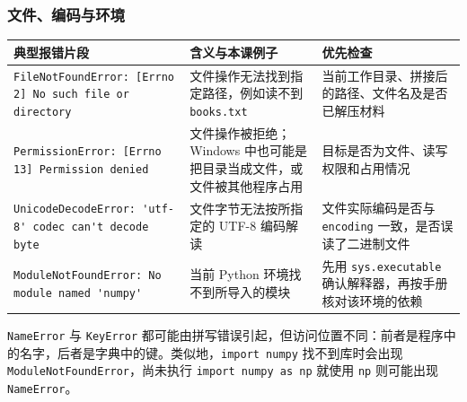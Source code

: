 \documentclass[UTF8,a4paper,11pt,fontset=fandol]{ctexart}
\providecommand{\passthrough}[1]{#1}
\begin{document}
\clearpage

\subsubsection{文件、编码与环境}\label{ux6587ux4ef6ux7f16ux7801ux4e0eux73afux5883}

\begin{longtable}[]{@{}
  >{\raggedright\arraybackslash}p{}
  >{\raggedright\arraybackslash}p{}
  >{\raggedright\arraybackslash}p{}@{}}
\toprule\noalign{}
\begin{minipage}[b]{\linewidth}\raggedright
典型报错片段
\end{minipage} & \begin{minipage}[b]{\linewidth}\raggedright
含义与本课例子
\end{minipage} & \begin{minipage}[b]{\linewidth}\raggedright
优先检查
\end{minipage} \\
\midrule\noalign{}
\endhead
\bottomrule\noalign{}
\endlastfoot
\passthrough{\lstinline!FileNotFoundError: [Errno 2] No such file or directory!} & 文件操作无法找到指定路径，例如读不到 \passthrough{\lstinline!books.txt!} & 当前工作目录、拼接后的路径、文件名及是否已解压材料 \\
\passthrough{\lstinline!PermissionError: [Errno 13] Permission denied!} & 文件操作被拒绝；Windows 中也可能是把目录当成文件，或文件被其他程序占用 & 目标是否为文件、读写权限和占用情况 \\
\passthrough{\lstinline!UnicodeDecodeError: 'utf-8' codec can't decode byte!} & 文件字节无法按所指定的 UTF-8 编码解读 & 文件实际编码是否与 \passthrough{\lstinline!encoding!} 一致，是否误读了二进制文件 \\
\passthrough{\lstinline!ModuleNotFoundError: No module named 'numpy'!} & 当前 Python 环境找不到所导入的模块 & 先用 \passthrough{\lstinline!sys.executable!} 确认解释器，再按手册核对该环境的依赖 \\
\end{longtable}

\passthrough{\lstinline!NameError!} 与 \passthrough{\lstinline!KeyError!} 都可能由拼写错误引起，但访问位置不同：前者是程序中的名字，后者是字典中的键。类似地，\passthrough{\lstinline!import numpy!} 找不到库时会出现 \passthrough{\lstinline!ModuleNotFoundError!}，尚未执行 \passthrough{\lstinline!import numpy as np!} 就使用 \passthrough{\lstinline!np!} 则可能出现 \passthrough{\lstinline!NameError!}。
\end{document}
